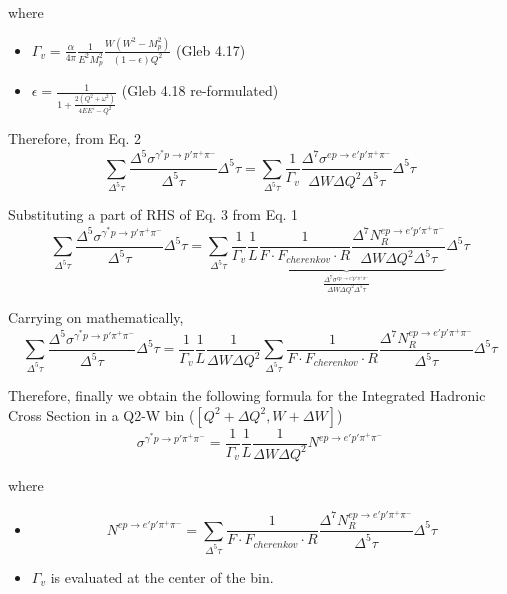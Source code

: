 \documentclass[12pt]{article}
\begin{document}
where
\begin{itemize}
	\item $\Gamma_{v}=\frac{\alpha}{4\pi}\frac{1}{E^{2}M_{p}^2}\frac{W(W^2-M_{p}^2)}{(1-\epsilon)Q^{2}}$ (Gleb 4.17)
	\item $\epsilon=\frac{1}{1+\frac{2(Q^2+\omega^{2})}{4EE'-Q^{2}}}$ (Gleb 4.18 re-formulated)
\end{itemize}


Therefore, from Eq. 2
\begin{equation}
\sum_{\Delta^{5} \tau}\frac{\Delta^{5}\sigma^{\gamma^{*}p \rightarrow p'\pi^{+}\pi^{-}}}{\Delta^{5} \tau} \Delta^{5}\tau
=
\sum_{\Delta^{5}\tau} \frac{1}{\Gamma_{v}}\frac{\Delta^{7}\sigma^{ep \rightarrow e'p'\pi^{+}\pi^{-}}}{\Delta W \Delta Q^{2} \Delta^{5} \tau} \Delta^{5}\tau
\end{equation}

Substituting a part of RHS of Eq. 3 from Eq. 1
\begin{equation}
\sum_{\Delta^{5} \tau}\frac{\Delta^{5}\sigma^{\gamma^{*}p \rightarrow p'\pi^{+}\pi^{-}}}{\Delta^{5} \tau} \Delta^{5}\tau
=
\sum_{\Delta^{5}\tau} \frac{1}{\Gamma_{v}}\underbrace{\frac{1}{L}\frac{1}{F \cdot F_{cherenkov} \cdot R}\frac{\Delta^{7}N_{R}^{ep \rightarrow e'p'\pi^{+}\pi^{-}}}{\Delta W \Delta Q^{2} \Delta^{5} \tau}}_{\frac{\Delta^{7}\sigma^{ep \rightarrow e'p'\pi^{+}\pi^{-}}}{\Delta W \Delta Q^{2} \Delta^{5} \tau}}  \Delta^{5}\tau
\end{equation}

Carrying on mathematically,
\begin{equation}
\sum_{\Delta^{5} \tau}\frac{\Delta^{5}\sigma^{\gamma^{*}p \rightarrow p'\pi^{+}\pi^{-}}}{\Delta^{5} \tau} \Delta^{5}\tau
=
\frac{1}{\Gamma_{v}}\frac{1}{L}\frac{1}{\Delta W \Delta Q^{2}}\sum_{\Delta^{5}\tau} \frac{1}{F \cdot F_{cherenkov} \cdot R}\frac{\Delta^{7}N_{R}^{ep \rightarrow e'p'\pi^{+}\pi^{-}}}{\Delta^{5} \tau} \Delta^{5}\tau
\end{equation}

Therefore, finally we obtain the following formula for the Integrated Hadronic Cross Section in a Q2-W bin ($[Q^2+\Delta Q^{2},W+\Delta W]$)
\begin{equation}
\sigma^{\gamma^{*}p \rightarrow p'\pi^{+}\pi^{-}}
=
\frac{1}{\Gamma_{v}}\frac{1}{L}\frac{1}{\Delta W \Delta Q^{2}} N^{ep \rightarrow e'p'\pi^{+}\pi^{-}}
\end{equation}

where
\begin{itemize}
	\item
	\begin{equation*}
	N^{ep \rightarrow e'p'\pi^{+}\pi^{-}} = \sum_{\Delta^{5}\tau} \frac{1}{F \cdot F_{cherenkov} \cdot R}\frac{\Delta^{7}N_{R}^{ep \rightarrow e'p'\pi^{+}\pi^{-}}}{\Delta^{5} \tau} \Delta^{5}\tau
	\end{equation*}
	\item $\Gamma_{v}$ is evaluated at the center of the bin.
\end{itemize}
\end{document}
